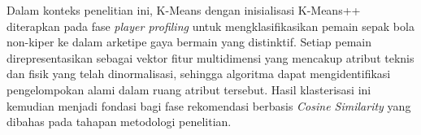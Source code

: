 Dalam konteks penelitian ini, K-Means dengan inisialisasi K-Means++ diterapkan pada fase \emph{player profiling} untuk mengklasifikasikan pemain sepak bola non-kiper ke dalam arketipe gaya bermain yang distinktif. Setiap pemain direpresentasikan sebagai vektor fitur multidimensi yang mencakup atribut teknis dan fisik yang telah dinormalisasi, sehingga algoritma dapat mengidentifikasi pengelompokan alami dalam ruang atribut tersebut. Hasil klasterisasi ini kemudian menjadi fondasi bagi fase rekomendasi berbasis \emph{Cosine Similarity} yang dibahas pada tahapan metodologi penelitian.
